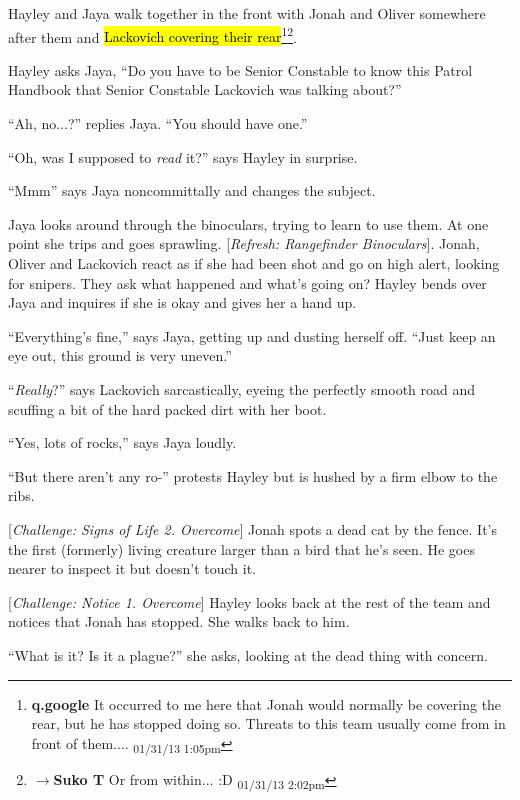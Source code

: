 Hayley and Jaya walk together in the front with Jonah and Oliver somewhere after them and \hl{Lackovich covering their rear}\footnote{\textbf{q.google }It occurred to me here that Jonah would normally be covering the rear, but he has stopped doing so.  Threats to this team usually come from in front of them.... \textsubscript{01/31/13 1:05pm}}\footnote{$\rightarrow$\textbf{Suko T }Or from within... :D \textsubscript{01/31/13 2:02pm}}.  



Hayley asks Jaya, ``Do you have to be Senior Constable to know this Patrol Handbook that Senior Constable Lackovich was talking about?''

``Ah, no...?'' replies Jaya.  ``You should have one.''

``Oh, was I supposed to \textit{read }it?'' says Hayley in surprise.

``Mmm'' says Jaya noncommittally and changes the subject.



Jaya looks around through the binoculars, trying to learn to use them.  At one point she trips and goes sprawling.  {[}\textit{Refresh: Rangefinder Binoculars}{]}. Jonah, Oliver and Lackovich react as if she had been shot and go on high alert, looking for snipers. They ask what happened and what's going on?  Hayley bends over Jaya and inquires if she is okay and gives her a hand up.

``Everything's fine,'' says Jaya, getting up and dusting herself off.  ``Just keep an eye out, this ground is very uneven.''

``\textit{Really}?'' says Lackovich sarcastically, eyeing the perfectly smooth road and scuffing a bit of the hard packed dirt with her boot.

``Yes, lots of rocks,'' says Jaya loudly.

``But there aren't any ro-'' protests Hayley but is hushed by a firm elbow to the ribs.



{[}\textit{Challenge: Signs of Life 2.  Overcome}{]} Jonah spots a dead cat by the fence.  It's the first (formerly) living creature larger than a bird that he's seen. He goes nearer to inspect it but doesn't touch it.



{[}\textit{Challenge: Notice 1.  Overcome}{]} Hayley looks back at the rest of the team and notices that Jonah has stopped.  She walks back to him. 

``What is it?  Is it a plague?'' she asks, looking at the dead thing with concern.

